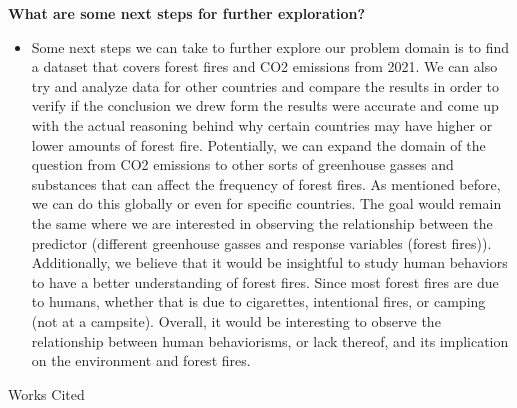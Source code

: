 \documentclass[fontsize=11pt]{article}
\begin{document}
\textbf{What are some next steps for further exploration?}
\begin{itemize}
    \item Some next steps we can take to further explore our problem domain is to find a dataset that covers forest fires and CO2 emissions from 2021. We can also try and analyze data for other countries and compare the results in order to verify if the conclusion we drew form the results were accurate and come up with the actual reasoning behind why certain countries may have higher or lower amounts of forest fire. Potentially, we can expand the domain of the question from CO2 emissions to other sorts of greenhouse gasses and substances that can affect the frequency of forest fires. As mentioned before, we can do this globally or even for specific countries. The goal would remain the same where we are interested in observing the relationship between the predictor (different greenhouse gasses and response variables (forest fires)). Additionally, we believe that it would be insightful to study human behaviors to have a better understanding of forest fires. Since most forest fires are due to humans, whether that is due to cigarettes, intentional fires, or camping (not at a campsite). Overall, it would be interesting to observe the relationship between human behaviorisms, or lack thereof, and its implication on the environment and forest fires.
\end{itemize}
\hline



\newpage
\begin{center}
    {Works Cited}
\end{center}
\newline
\newline
\end{document}
